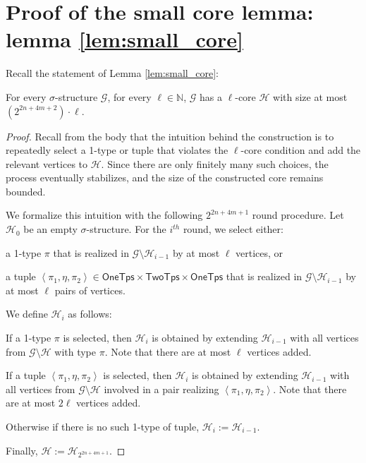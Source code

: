 \documentclass[10pt,a4paper]{article}
\theoremstyle{definition}
\theoremstyle{remark}
\newcommand{\cG}{\mathcal{G}}
\newcommand{\cH}{\mathcal{H}}
\newcommand{\bbN}{\mathbb{N}}
\newcommand{\vocab}{\sigma}
\newcommand{\twotypes}{\mathsf{TwoTps}}
\newcommand{\onetypes}{\mathsf{OneTps}}
\newcommand{\tuple}[1]       {\left\langle #1 \right\rangle}
\begin{document}
\section*{Proof of the small core lemma: lemma \ref{lem:small_core}}
Recall the statement of Lemma \ref{lem:small_core}:

\medskip

    For every $\vocab$-structure $\cG$, for every $\ell \in \bbN$,
    $\cG$ has a $\ell$-core $\cH$ with size at most $(2^{2n+4m+2}) \cdot \ell$.

\medskip


\begin{proof}
    Recall from the body that the intuition behind the construction is to repeatedly select a 1-type or tuple that violates the $\ell$-core condition
    and add the relevant vertices to $\cH$.
    Since there are only finitely many such choices, the process eventually stabilizes,
    and the size of the constructed core remains bounded.

    We formalize this intuition with the following $2^{2n+4m+1}$ round procedure.
    Let $\cH_0$ be an empty $\vocab$-structure.
    For the $i^{th}$ round,
    we select either:
    \begin{compactitem}
        \item
            a 1-type $\pi$ that is realized in $\cG \setminus \cH_{i-1}$ by at most $\ell$ vertices, or

        \item
            a tuple $\tuple{\pi_1, \eta, \pi_2} \in \onetypes \times \twotypes \times \onetypes$ that is realized in $\cG \setminus \cH_{i-1}$ by at most $\ell$ pairs of vertices.
    \end{compactitem}
    We define $\cH_{i}$ as follows:
    \begin{compactitem}
        \item
           If a 1-type $\pi$ is selected, then $\cH_i$ is obtained by extending $\cH_{i-1}$
           with all vertices from $\cG \setminus \cH$ with type $\pi$. 
            Note that there are at most $\ell$ vertices added.
        \item
            If a tuple $\tuple{\pi_1, \eta, \pi_2}$ is selected,
            then $\cH_i$ is obtained by extending  $\cH_{i-1}$ with all vertices from $\cG \setminus \cH$ involved in a pair realizing $\tuple{\pi_1, \eta, \pi_2}$.
            Note that there are at most $2\ell$ vertices added.
        \item Otherwise if there is no such 1-type of tuple, $\cH_i := \cH_{i-1}$.
    \end{compactitem}
    Finally, $\cH := \cH_{2^{2n+4m+1}}$.


\end{proof}
\end{document}
